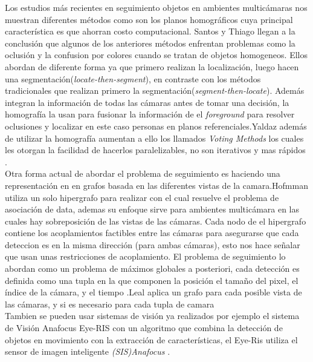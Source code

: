 \documentclass[conference]{IEEEtran}
\begin{document}
Los estudios m\'as recientes en seguimiento objetos en ambientes multic\'amaras nos muestran diferentes m\'etodos como son los planos homogr\'aficos cuya principal caracter\'istica es que ahorran costo computacional. Santos y Thiago llegan a la conclusi\'on que algunos de los anteriores m\'etodos enfrentan problemas como la oclusi\'on y la confusion por colores cuando se tratan de objetos homogeneos. Ellos abordan de diferente forma ya que primero realizan la localizaci\'on, luego hacen una segmentaci\'on(\textit{locate-then-segment}), en contraste con los m\'etodos tradicionales que realizan primero la segmentaci\'on(\textit{segment-then-locate}). Adem\'as integran la informaci\'on de todas las c\'amaras antes de tomar una decisi\'on, la homograf\'ia la usan para fusionar la informaci\'on de el \textit{foreground} para resolver oclusiones y localizar en este caso personas en planos referenciales\cite{Santos_art}.Yaldaz adem\'as de  utilizar la homograf\'ia aumentan a ello  los llamados \textit{Voting Methods} los cuales les otorgan la facilidad de hacerlos paralelizables, no son iterativos y mas r\'apidos \cite{yaldaz_mot}. \\
Otra forma actual de abordar el problema de seguimiento es haciendo una representaci\'on en en grafos basada en las diferentes vistas de la camara.Hofmman utiliza un solo hipergrafo para realizar con el cual resuelve el problema de asociaci\'on de data, ademas su enfoque sirve para ambientes multic\'amara en las cuales hay sobreposici\'on de las vistas de las c\'amaras. Cada nodo de el hipergrafo contiene los acoplamientos factibles entre las c\'amaras para asegurarse que cada deteccion es en la misma direcci\'on (para ambas c\'amaras), esto nos hace se\~nalar que usan unas restricciones de acoplamiento. El problema de seguimiento lo abordan como un problema de m\'aximos globales a posteriori, cada detecci\'on es definida como una tupla en la que componen la posici\'on el tama\~no del pixel, el \'indice de la c\'amara, y el tiempo \cite{Hofman_art}.Leal aplica un grafo para cada posible vista de las c\'amaras, y si es necesario para cada tupla de camara\cite{Leal_art}\\
Tambien se pueden usar sistemas de visi\'on ya realizados por ejemplo el sistema de Visi\'on Anafocus Eye-RIS con un algoritmo  que combina la detecci\'on de objetos en movimiento con la extracci\'on de caracter\'isticas, el Eye-Ris utiliza el sensor de imagen inteligente \textit{(SIS)Anafocus} \cite{karabiber_mot}.\\
\end{document}
